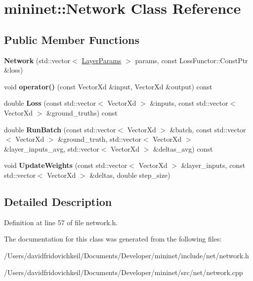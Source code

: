 \hypertarget{classmininet_1_1_network}{}\section{mininet\+:\+:Network Class Reference}
\label{classmininet_1_1_network}
\subsection*{Public Member Functions}
\begin{DoxyCompactItemize}
\item 
\hypertarget{classmininet_1_1_network_acf2c102c6f79c152380124af7b327b89}{}\label{classmininet_1_1_network_acf2c102c6f79c152380124af7b327b89} 
{\bfseries Network} (std\+::vector$<$ \hyperlink{structmininet_1_1_layer_params}{Layer\+Params} $>$ params, const Loss\+Functor\+::\+Const\+Ptr \&loss)
\item 
\hypertarget{classmininet_1_1_network_a56fe1d7f1daf3433c9f0d5df408b4800}{}\label{classmininet_1_1_network_a56fe1d7f1daf3433c9f0d5df408b4800} 
void {\bfseries operator()} (const Vector\+Xd \&input, Vector\+Xd \&output) const
\item 
\hypertarget{classmininet_1_1_network_ae76628cf7258aa0b8d0ee147e580623e}{}\label{classmininet_1_1_network_ae76628cf7258aa0b8d0ee147e580623e} 
double {\bfseries Loss} (const std\+::vector$<$ Vector\+Xd $>$ \&inputs, const std\+::vector$<$ Vector\+Xd $>$ \&ground\+\_\+truths) const
\item 
\hypertarget{classmininet_1_1_network_abc9f2dbdbc85532cb2758f6877d4d292}{}\label{classmininet_1_1_network_abc9f2dbdbc85532cb2758f6877d4d292} 
double {\bfseries Run\+Batch} (const std\+::vector$<$ Vector\+Xd $>$ \&batch, const std\+::vector$<$ Vector\+Xd $>$ \&ground\+\_\+truth, std\+::vector$<$ Vector\+Xd $>$ \&layer\+\_\+inputs\+\_\+avg, std\+::vector$<$ Vector\+Xd $>$ \&deltas\+\_\+avg) const
\item 
\hypertarget{classmininet_1_1_network_a96c186885b661e8dcdef8e7a04e06528}{}\label{classmininet_1_1_network_a96c186885b661e8dcdef8e7a04e06528} 
void {\bfseries Update\+Weights} (const std\+::vector$<$ Vector\+Xd $>$ \&layer\+\_\+inputs, const std\+::vector$<$ Vector\+Xd $>$ \&deltas, double step\+\_\+size)
\end{DoxyCompactItemize}


\subsection{Detailed Description}


Definition at line 57 of file network.\+h.



The documentation for this class was generated from the following files\+:\begin{DoxyCompactItemize}
\item 
/\+Users/davidfridovichkeil/\+Documents/\+Developer/mininet/include/net/network.\+h\item 
/\+Users/davidfridovichkeil/\+Documents/\+Developer/mininet/src/net/network.\+cpp\end{DoxyCompactItemize}
